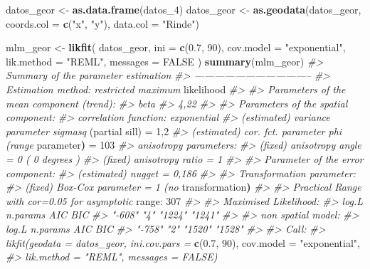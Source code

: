 \documentclass[11pt,b5paper,]{krantz}
\newenvironment{Shaded}{}{}
\newcommand{\KeywordTok}[1]{\textcolor[rgb]{0.00,0.44,0.13}{\textbf{#1}}}
\newcommand{\DataTypeTok}[1]{\textcolor[rgb]{0.56,0.13,0.00}{#1}}
\newcommand{\DecValTok}[1]{\textcolor[rgb]{0.25,0.63,0.44}{#1}}
\newcommand{\FloatTok}[1]{\textcolor[rgb]{0.25,0.63,0.44}{#1}}
\newcommand{\StringTok}[1]{\textcolor[rgb]{0.25,0.44,0.63}{#1}}
\newcommand{\CommentTok}[1]{\textcolor[rgb]{0.38,0.63,0.69}{\textit{#1}}}
\newcommand{\OtherTok}[1]{\textcolor[rgb]{0.00,0.44,0.13}{#1}}
\newcommand{\OperatorTok}[1]{\textcolor[rgb]{0.40,0.40,0.40}{#1}}
\newcommand{\ErrorTok}[1]{\textcolor[rgb]{1.00,0.00,0.00}{\textbf{#1}}}
\newcommand{\NormalTok}[1]{#1}
\begin{document}
\begin{Shaded}
\begin{Highlighting}[]
\NormalTok{datos_geor <-}\StringTok{ }\KeywordTok{as.data.frame}\NormalTok{(datos_}\DecValTok{4}\NormalTok{)}
\NormalTok{datos_geor <-}
\StringTok{  }\KeywordTok{as.geodata}\NormalTok{(datos_geor,}
             \DataTypeTok{coords.col =} \KeywordTok{c}\NormalTok{(}\StringTok{"x"}\NormalTok{, }\StringTok{"y"}\NormalTok{),}
             \DataTypeTok{data.col =} \StringTok{"Rinde"}\NormalTok{)}

\NormalTok{mlm_geor <-}
\StringTok{  }\KeywordTok{likfit}\NormalTok{(}
\NormalTok{    datos_geor,}
    \DataTypeTok{ini =} \KeywordTok{c}\NormalTok{(}\FloatTok{0.7}\NormalTok{, }\DecValTok{90}\NormalTok{),}
    \DataTypeTok{cov.model =} \StringTok{"exponential"}\NormalTok{,}
    \DataTypeTok{lik.method =} \StringTok{"REML"}\NormalTok{,}
    \DataTypeTok{messages =} \OtherTok{FALSE}
\NormalTok{  )}
\KeywordTok{summary}\NormalTok{(mlm_geor)}
\CommentTok{#> Summary of the parameter estimation}
\CommentTok{#> -----------------------------------}
\CommentTok{#> Estimation method: restricted maximum}
\NormalTok{likelihood}
\CommentTok{#>}
\CommentTok{#> Parameters of the mean component (trend):}
\CommentTok{#> beta}
\CommentTok{#> 4,22}
\CommentTok{#>}
\CommentTok{#> Parameters of the spatial component:}
\CommentTok{#> correlation function: exponential}
\CommentTok{#> (estimated) variance parameter sigmasq}
\NormalTok{(partial sill) =}\StringTok{ }\DecValTok{1}\NormalTok{,}\DecValTok{2}
\CommentTok{#> (estimated) cor. fct. parameter phi (range}
\NormalTok{parameter}\ErrorTok{)}\NormalTok{ =}\StringTok{ }\DecValTok{103}
\CommentTok{#> anisotropy parameters:}
\CommentTok{#> (fixed) anisotropy angle = 0 ( 0 degrees )}
\CommentTok{#> (fixed) anisotropy ratio = 1}
\CommentTok{#>}
\CommentTok{#> Parameter of the error component:}
\CommentTok{#> (estimated) nugget = 0,186}
\CommentTok{#>}
\CommentTok{#> Transformation parameter:}
\CommentTok{#> (fixed) Box-Cox parameter = 1 (no}
\NormalTok{transformation}\ErrorTok{)}
\CommentTok{#>}
\CommentTok{#> Practical Range with cor=0.05 for asymptotic}
\NormalTok{range}\OperatorTok{:}\StringTok{ }\DecValTok{307}
\CommentTok{#>}
\CommentTok{#> Maximised Likelihood:}
\CommentTok{#> log.L n.params AIC BIC}
\CommentTok{#> "-608" "4" "1224" "1241"}
\CommentTok{#>}
\CommentTok{#> non spatial model:}
\CommentTok{#> log.L n.params AIC BIC}
\CommentTok{#> "-758" "2" "1520" "1528"}
\CommentTok{#>}
\CommentTok{#> Call:}
\CommentTok{#> likfit(geodata = datos_geor, ini.cov.pars =}
\KeywordTok{c}\NormalTok{(}\FloatTok{0.7}\NormalTok{, }\DecValTok{90}\NormalTok{), cov.model =}\StringTok{ "exponential"}\NormalTok{,}
\CommentTok{#> lik.method = "REML", messages = FALSE)}
\end{Highlighting}
\end{Shaded}
\end{document}
